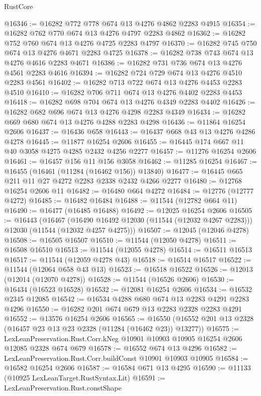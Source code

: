 \begin{lexlean}{RustCore}
\begin{coremodule}
@16346 := @16282 @772 @778 @674 @13 @4276 @4862 @2283 @4915
@16354 := @16282 @762 @770 @674 @13 @4276 @4797 @2283 @4862
@16362 := @16282 @752 @760 @674 @13 @4276 @4725 @2283 @4797
@16370 := @16282 @745 @750 @674 @13 @4276 @4671 @2283 @4725
@16378 := @16282 @738 @743 @674 @13 @4276 @4616 @2283 @4671
@16386 := @16282 @731 @736 @674 @13 @4276 @4561 @2283 @4616
@16394 := @16282 @724 @729 @674 @13 @4276 @4510 @2283 @4561
@16402 := @16282 @713 @722 @674 @13 @4276 @4453 @2283 @4510
@16410 := @16282 @706 @711 @674 @13 @4276 @4402 @2283 @4453
@16418 := @16282 @698 @704 @674 @13 @4276 @4349 @2283 @4402
@16426 := @16282 @682 @696 @674 @13 @4276 @4298 @2283 @4349
@16434 := @16282 @669 @680 @674 @13 @4276 @4288 @2283 @4298
@16436 := @11864 @16254 @2606
@16437 := @16436 @658
@16443 := @16437 @668 @43 @13 @4276 @4286 @4278
@16445 := @11877 @16254 @2606
@16455 := @16445 @174 @667 @11 @40 @3058 @4275 @4285 @2432 @4256 @2277
@16457 := @11276 @16254 @2606
@16461 := @16457 @156 @11 @156 @3058
@16462 := @11285 @16254
@16467 := @16455 (@16461 (@11284 (@16462 @156)) @13840)
@16477 := @16445 @665 @211 @11 @27 @4272 @2283 @2338 @2432 @4266 @2277
@16480 := @12768 @16254 @2606 @11
@16482 := @16480 @664 @4272
@16484 := @12776 (@12777 @4272)
@16485 := @16482 @16484
@16488 := @11544 (@12782 @664 @11)
@16490 := @16477 (@16485 @16488)
@16492 := @12025 @16254 @2606
@16505 := @16443
    (@16467
      (@16490 @16492 @12030 (@11544 (@12032 @4267 @2283)))
      @12030
      (@11544 (@12032 @4257 @4275)))
@16507 := @12045 (@12046 @4278)
@16508 := @16505 @16507
@16510 := @11544 (@12050 @4278)
@16511 := @16508 @16510
@16513 := @11544 (@12055 @4278)
@16514 := @16511 @16513
@16517 := @11544 (@12059 @4278 @43)
@16518 := @16514 @16517
@16522 := @11544 (@12064 @658 @43 @13)
@16523 := @16518 @16522
@16526 := @12013 (@12014 (@12070 @4278))
@16528 := @11544 (@16526 @2606)
@16530 := @16434 (@16523 @16528)
@16532 := @12081 @16254 @2606
@16534 := @16532 @2345 @12085
@16542 := @16534 @4288 @680 @674 @13 @2283 @4291 @2283 @4296
@16550 := @16282 @201 @674 @679 @13 @2283 @2328 @2283 @4291
@16552 := @13576 @16254 @2606
@16565 := @16550 (@16552 @201 @13 @2328 (@16457 @23 @13 @23 @2328 (@11284 (@16462 @23)) @13277))
@16575 := LexLeanPreservation.Rust.Corr.kNeg
    @10901
    @10903
    @10905
    @16254
    @2606
    @12085
    @2328
    @674
    @679
@16578 := @16552 @674 @13 @4296
@16582 := LexLeanPreservation.Rust.Corr.buildConst @10901 @10903 @10905
@16584 := @16582 @16254 @2606
@16587 := @16584 @671 @13 @4295
@16590 := @11133 (@10925 LexLeanTarget.RustSyntax.Lit)
@16591 := LexLeanPreservation.Rust.constShape

\end{coremodule}
\end{lexlean}
